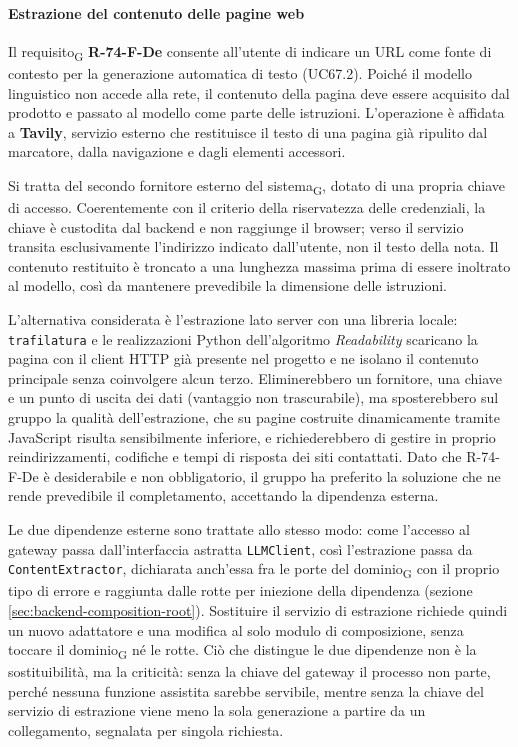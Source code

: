 \documentclass[a4paper, 10pt]{article}
\begin{document}
\paragraph{Estrazione del contenuto delle pagine web}
Il requisito\textsubscript{G} \textbf{R-74-F-De} consente all'utente di indicare un URL come fonte di contesto per la generazione automatica di testo (UC67.2). Poiché il modello linguistico non accede alla rete, il contenuto della pagina deve essere acquisito dal prodotto e passato al modello come parte delle istruzioni. L'operazione è affidata a \textbf{Tavily}, servizio esterno che restituisce il testo di una pagina già ripulito dal marcatore, dalla navigazione e dagli elementi accessori.

Si tratta del secondo fornitore esterno del sistema\textsubscript{G}, dotato di una propria chiave di accesso. Coerentemente con il criterio della riservatezza delle credenziali, la chiave è custodita dal backend e non raggiunge il browser; verso il servizio transita esclusivamente l'indirizzo indicato dall'utente, non il testo della nota. Il contenuto restituito è troncato a una lunghezza massima prima di essere inoltrato al modello, così da mantenere prevedibile la dimensione delle istruzioni.

L'alternativa considerata è l'estrazione lato server con una libreria locale: \texttt{trafilatura} e le realizzazioni Python dell'algoritmo \textit{Readability} scaricano la pagina con il client HTTP già presente nel progetto e ne isolano il contenuto principale senza coinvolgere alcun terzo. Eliminerebbero un fornitore, una chiave e un punto di uscita dei dati (vantaggio non trascurabile), ma sposterebbero sul gruppo la qualità dell'estrazione, che su pagine costruite dinamicamente tramite JavaScript risulta sensibilmente inferiore, e richiederebbero di gestire in proprio reindirizzamenti, codifiche e tempi di risposta dei siti contattati. Dato che R-74-F-De è desiderabile e non obbligatorio, il gruppo ha preferito la soluzione che ne rende prevedibile il completamento, accettando la dipendenza esterna.

Le due dipendenze esterne sono trattate allo stesso modo: come l'accesso al gateway passa dall'interfaccia astratta \texttt{LLMClient}, così l'estrazione passa da \texttt{ContentExtractor}, dichiarata anch'essa fra le porte del dominio\textsubscript{G} con il proprio tipo di errore e raggiunta dalle rotte per iniezione della dipendenza (sezione \ref{sec:backend-composition-root}). Sostituire il servizio di estrazione richiede quindi un nuovo adattatore e una modifica al solo modulo di composizione, senza toccare il dominio\textsubscript{G} né le rotte. Ciò che distingue le due dipendenze non è la sostituibilità, ma la criticità: senza la chiave del gateway il processo non parte, perché nessuna funzione assistita sarebbe servibile, mentre senza la chiave del servizio di estrazione viene meno la sola generazione a partire da un collegamento, segnalata per singola richiesta.
\end{document}
